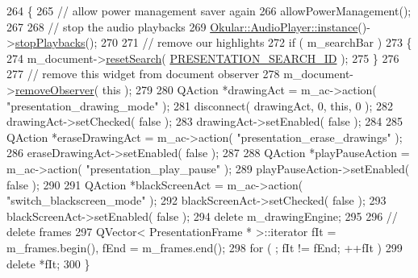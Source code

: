 \begin{DoxyCode}
264 \{
265     \textcolor{comment}{// allow power management saver again}
266     allowPowerManagement();
267 
268     \textcolor{comment}{// stop the audio playbacks}
269     \hyperlink{classOkular_1_1AudioPlayer_a5bbc067e81b46451098a2a0becf23e67}{Okular::AudioPlayer::instance}()->\hyperlink{classOkular_1_1AudioPlayer_a48730f5eb7dbc0551679c367e0ba9234}{stopPlaybacks}();
270 
271     \textcolor{comment}{// remove our highlights}
272     \textcolor{keywordflow}{if} ( m\_searchBar )
273     \{
274         m\_document->\hyperlink{classOkular_1_1Document_a9a6bfbdfcf7a07fcf3b2624fdea81126}{resetSearch}( \hyperlink{core_2document_8h_acd6eb601c5a13e8378441bedbfc608c2}{PRESENTATION\_SEARCH\_ID} );
275     \}
276 
277     \textcolor{comment}{// remove this widget from document observer}
278     m\_document->\hyperlink{classOkular_1_1Document_a2d704dea2ab28c846e58443ac38841f2}{removeObserver}( \textcolor{keyword}{this} );
279 
280     QAction *drawingAct = m\_ac->action( \textcolor{stringliteral}{"presentation\_drawing\_mode"} );
281     disconnect( drawingAct, 0, \textcolor{keyword}{this}, 0 );
282     drawingAct->setChecked( \textcolor{keyword}{false} );
283     drawingAct->setEnabled( \textcolor{keyword}{false} );
284 
285     QAction *eraseDrawingAct = m\_ac->action( \textcolor{stringliteral}{"presentation\_erase\_drawings"} );
286     eraseDrawingAct->setEnabled( \textcolor{keyword}{false} );
287 
288     QAction *playPauseAction = m\_ac->action( \textcolor{stringliteral}{"presentation\_play\_pause"} );
289     playPauseAction->setEnabled( \textcolor{keyword}{false} );
290 
291     QAction *blackScreenAct = m\_ac->action( \textcolor{stringliteral}{"switch\_blackscreen\_mode"} );
292     blackScreenAct->setChecked( \textcolor{keyword}{false} );
293     blackScreenAct->setEnabled( \textcolor{keyword}{false} );
294     \textcolor{keyword}{delete} m\_drawingEngine;
295 
296     \textcolor{comment}{// delete frames}
297     QVector< PresentationFrame * >::iterator fIt = m\_frames.begin(), fEnd = m\_frames.end();
298     \textcolor{keywordflow}{for} ( ; fIt != fEnd; ++fIt )
299         \textcolor{keyword}{delete} *fIt;
300 \}
\end{DoxyCode}


